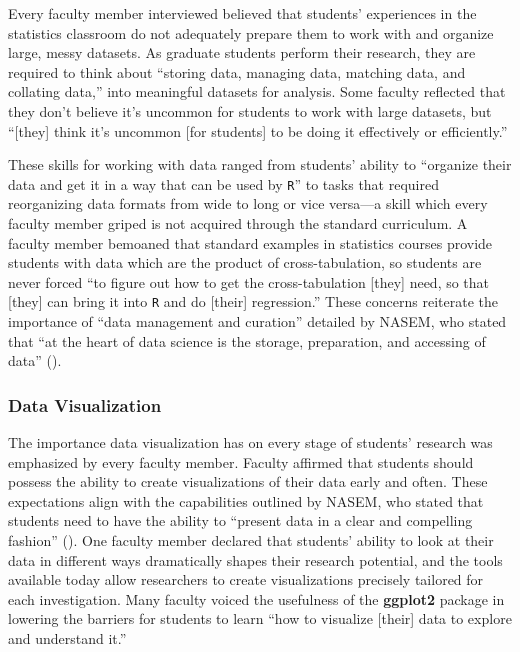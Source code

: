 \documentclass[12pt]{article}
\begin{document}
\noindent Every faculty member interviewed believed that students' experiences in
the statistics classroom do not adequately prepare them to work with and
organize large, messy datasets. As graduate students perform their research,
they are required to think about ``storing data, managing data, matching
data, and collating data,'' into meaningful datasets for analysis. Some 
faculty reflected that they don't believe it's uncommon for students to work
with large datasets, but ``[they] think it's uncommon [for students] to be doing
it effectively or efficiently.'' 

\quad These skills for working with data ranged from students' ability to 
``organize their data and get it in a way that can be used by \texttt{R}'' to 
tasks that required reorganizing data formats from wide to long or vice 
versa---a skill which every faculty member griped is not acquired through the
standard curriculum. A faculty member bemoaned that standard examples in
statistics courses provide students with data which are the product
of cross-tabulation, so students are never forced ``to figure out how to get the
cross-tabulation [they] need, so that [they] can bring it into \texttt{R} and do
[their] regression.'' These concerns reiterate the importance of ``data
management and curation'' detailed by NASEM, who stated that ``at the heart of
data science is the storage, preparation, and accessing of data'' 
(\citeyear[p.\ 26]{nas}). 

\subsubsection{Data Visualization} 

\noindent The importance data visualization has on every stage of students'
research was emphasized by every faculty member. Faculty affirmed
that students should possess the ability to create visualizations of their data
early and often. These expectations align with the capabilities outlined by
NASEM, who stated that students need to have the ability to ``present data in a
clear and compelling fashion'' (\citeyear[p.\ 26]{nas}). One faculty member
declared that students' ability to look at their data in different ways
dramatically shapes their research potential, and the tools available today
allow researchers to create visualizations precisely tailored for each
investigation. Many faculty voiced the usefulness of the \textbf{ggplot2} 
package \citep{ggplot} in lowering the barriers for students to learn ``how to
visualize [their] data to explore and understand it.'' 
\end{document}
